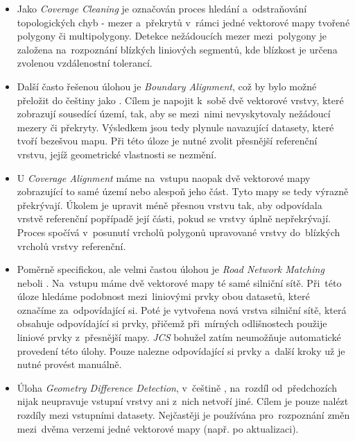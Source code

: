 \begin{itemize}
 \item Jako \textit{Coverage Cleaning} je  označován proces hledání
    a~odstraňování topologických chyb - mezer a~překrytů v~rámci jedné
    vektorové mapy tvořené polygony či multipolygony. Detekce nežádoucích
    mezer mezi~polygony je založena na~rozpoznání blízkých liniových segmentů,
    kde blízkost je určena zvolenou vzdálenostní tolerancí. 

 \item Další často řešenou úlohou je \textit{Boundary Alignment}, což by
    bylo možné přeložit do češtiny jako . 
    Cílem je napojit k~sobě dvě vektorové vrstvy, které zobrazují sousedící
    území, tak, aby se mezi~nimi nevyskytovaly nežádoucí mezery či překryty.
    Výsledkem jsou tedy plynule navazující datasety, které tvoří bezešvou mapu.
    Při této úloze je nutné zvolit přesnější referenční vrstvu, jejíž 
    geometrické vlastnosti se nezmění.

 \item U \textit{Coverage Alignment} máme na~vstupu naopak dvě vektorové
    mapy zobrazující to samé území nebo alespoň jeho část. Tyto mapy se 
    tedy výrazně překrývají. Úkolem je upravit méně přesnou vrstvu tak,
    aby odpovídala vrstvě referenční popřípadě její části, pokud se vrstvy
    úplně nepřekrývají. Proces spočívá v~posunutí vrcholů polygonů upravované
    vrstvy do~blízkých vrcholů vrstvy referenční.

 \item Poměrně specifickou, ale velmi častou úlohou je \textit{Road Network 
    Matching} neboli . Na~vstupu máme dvě 
    vektorové mapy té samé silniční sítě. Při~této úloze hledáme podobnost
    mezi~liniovými prvky obou datasetů, které označíme za~odpovídající si.
    Poté je vytvořena nová vrstva silniční sítě, která obsahuje odpovídající
    si prvky, přičemž při~mírných odlišnostech použije liniové prvky z~přesnější
    mapy. \textit{JCS} bohužel zatím neumožňuje automatické provedení této
    úlohy. Pouze nalezne odpovídající si prvky a~další kroky už je nutné provést
    manuálně.

\item Úloha \textit{Geometry Difference Detection}, v~češtině , na~rozdíl od~předchozích nijak neupravuje vstupní
    vrstvy ani z~nich netvoří jiné. Cílem je pouze nalézt rozdíly mezi vstupními
    datasety. Nejčastěji je používána pro~rozpoznání změn mezi~dvěma verzemi
    jedné vektorové mapy (např. po aktualizaci).
\end{itemize}

